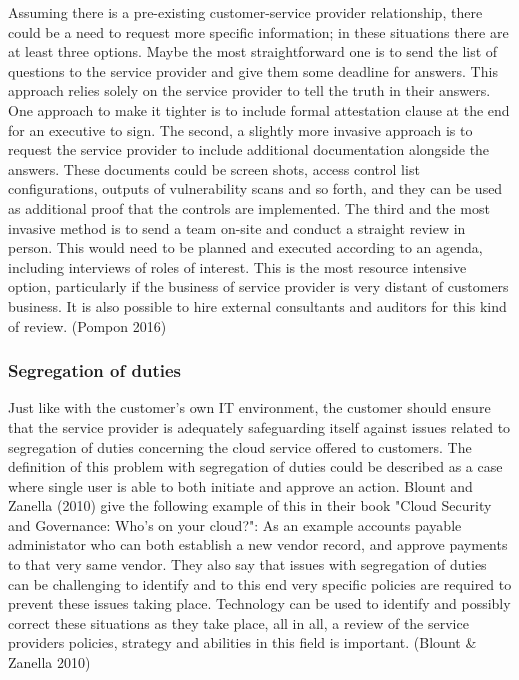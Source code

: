 \documentclass{article}
\begin{document}
Assuming there is a pre-existing customer-service provider relationship, there could be a need to request more specific information; in these situations there are at least three options. Maybe the most straightforward one is to send the list of questions to the service provider and give them some deadline for answers. This approach relies solely on the service provider to tell the truth in their answers. One approach to make it tighter is to include formal attestation clause at the end for an executive to sign. The second, a slightly more invasive approach is to request the service provider to include additional documentation alongside the answers. These documents could be screen shots, access control list configurations, outputs of vulnerability scans and so forth, and they can be used as additional proof that the controls are implemented. The third and the most invasive method is to send a team on-site and conduct a straight review in person. This would need to be planned and executed according to an agenda, including interviews of roles of interest. This is the most resource intensive option, particularly if the business of service provider is very distant of customers business. It is also possible to hire external consultants and auditors for this kind of review. (Pompon 2016) 
\subsubsection{Segregation of duties}
Just like with the customer's own IT environment, the customer should ensure that the service provider is adequately safeguarding itself against issues related to segregation of duties concerning the cloud service offered to customers.
The definition of this problem with segregation of duties could be described as a case where single user is able to both initiate and approve an action. Blount and Zanella (2010) give the following example of this in their book "Cloud Security and Governance: Who's on your cloud?": As an example accounts payable administator who can both establish a new vendor record, and approve payments to that very same vendor. They also say that issues with segregation of duties can be challenging to identify and to this end very specific policies are required to prevent these issues taking place. Technology can be used to identify and possibly correct these situations as they take place, all in all, a review of the service providers policies, strategy and abilities in this field is important. (Blount \& Zanella 2010)
\end{document}
